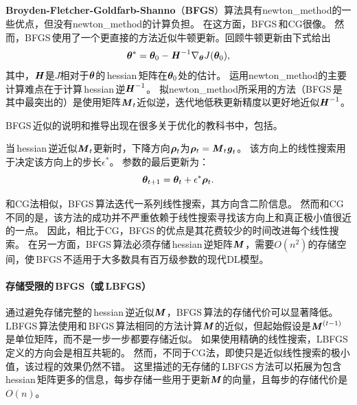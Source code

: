 \subsection{}
\label{sec:bfgs}
\textbf{Broyden-Fletcher-Goldfarb-Shanno}（\textbf{\gls{BFGS}}）算法具有\gls{newton_method}的一些优点，但没有\gls{newton_method}的计算负担。
在这方面，\gls{BFGS}\,和CG很像。
然而，\gls{BFGS}\,使用了一个更直接的方法近似牛顿更新。回顾牛顿更新由下式给出
\begin{equation}
    \boldsymbol{\theta}^* = \boldsymbol{\theta}_0 - \boldsymbol{\mathit{H}}^{-1} \nabla_{\boldsymbol{\theta}} J(\boldsymbol{\theta}_0),
\end{equation}
其中，$\boldsymbol{\mathit{H}}$是$J$相对于$\boldsymbol{\theta}$的\,\gls{hessian}\,矩阵在$\boldsymbol{\theta}_0$处的估计。
运用\gls{newton_method}的主要计算难点在于计算\,\gls{hessian}\,逆$\boldsymbol{\mathit{H}}^{-1}$。
拟\gls{newton_method}所采用的方法（\gls{BFGS}\,是其中最突出的）是使用矩阵$\boldsymbol{\mathit{M}}_t$近似逆，迭代地低秩更新精度以更好地近似$\boldsymbol{\mathit{H}}^{-1}$。


\gls{BFGS}\,近似的说明和推导出现在很多关于优化的教科书中，包括\cite{Lue84}。

当\,\gls{hessian}\,逆近似$\boldsymbol{\mathit{M}}_t$更新时，下降方向$\boldsymbol{\rho}_t$为$\boldsymbol{\rho}_t = \boldsymbol{\mathit{M}}_t \boldsymbol{\mathit{g}}_t$。
该方向上的线性搜索用于决定该方向上的步长$\epsilon^*$。
参数的最后更新为：
\begin{equation}
    \boldsymbol{\theta}_{t+1} = \boldsymbol{\theta}_t + \epsilon^* \boldsymbol{\rho}_t.
\end{equation}

和\gls{CG}法相似，\gls{BFGS}\,算法迭代一系列线性搜索，其方向含二阶信息。
然而和\gls{CG}不同的是，该方法的成功并不严重依赖于线性搜索寻找该方向上和真正极小值很近的一点。
因此，相比于\gls{CG}，\gls{BFGS}\,的优点是其花费较少的时间改进每个线性搜索。
在另一方面，\gls{BFGS}\,算法必须存储\,\gls{hessian}\,逆矩阵$\boldsymbol{\mathit{M}}$，需要$O(n^2)$的存储空间，使\,\gls{BFGS}\,不适用于大多数具有百万级参数的现代\gls{DL}模型。

\paragraph{存储受限的\,\gls{BFGS}（或\,\gls{LBFGS}）}
通过避免存储完整的\,\gls{hessian}\,逆近似$\boldsymbol{\mathit{M}}$，\gls{BFGS}\,算法的存储代价可以显著降低。
\gls{LBFGS}\,算法使用和\,\gls{BFGS}\,算法相同的方法计算$\boldsymbol{\mathit{M}}$的近似，但起始假设是$\boldsymbol{\mathit{M}}^{(t-1)}$是单位矩阵，而不是一步一步都要存储近似。
如果使用精确的线性搜索，\gls{LBFGS}\,定义的方向会是相互共轭的。
然而，不同于\gls{CG}法，即使只是近似线性搜索的极小值，该过程的效果仍然不错。
这里描述的无存储的\,\gls{LBFGS}\,方法可以拓展为包含\,\gls{hessian}\,矩阵更多的信息，每步存储一些用于更新$\boldsymbol{\mathit{M}}$的向量，且每步的存储代价是$O(n)$。

